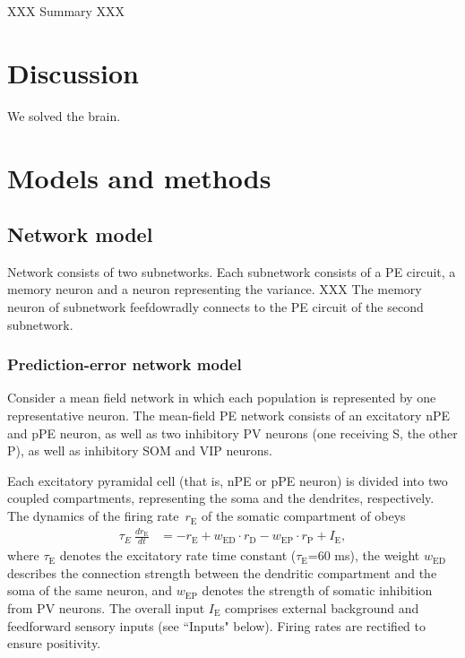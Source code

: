 \documentclass[10pt,a4paper,draft]{article}
\begin{document}
XXX Summary XXX


\section*{Discussion}

We solved the brain.


\section*{Models and methods}
%

\subsection*{Network model}
%
Network consists of two subnetworks. Each subnetwork consists of a PE circuit, a memory neuron and a neuron representing the variance. XXX The memory neuron of subnetwork feefdowradly connects to the PE circuit of the second subnetwork.

\subsubsection*{Prediction-error network model}
%
Consider a mean field network in which each population is represented by one representative neuron. The mean-field PE network consists of an excitatory nPE and pPE neuron, as well as two inhibitory PV neurons (one receiving S, the other P), as well as inhibitory SOM and VIP neurons.

Each excitatory pyramidal cell (that is, nPE or pPE neuron) is divided into two coupled compartments, representing the soma and the dendrites, respectively. The dynamics of the firing rate~$r_{\mathrm{E}}$ of the somatic compartment of obeys \citep{wilson1972excitatory}
%
\begin{align}
\tau_E\ \frac{dr_\mathrm{E}}{dt} &= - r_\mathrm{E} + w_\mathrm{ED}\cdot  r_\mathrm{D}  -  w_\mathrm{EP}\cdot r_\mathrm{P} + I_\mathrm{E},
\end{align}
%
where $\tau_\mathrm{E}$ denotes the excitatory rate time constant ($\tau_\mathrm{E}$=60 ms), the weight $w_{\mathrm{ED}}$ describes the connection strength between the dendritic compartment and the soma of the same neuron, and $w_{\mathrm{EP}}$ denotes the strength of somatic inhibition from PV neurons. The overall input $I_\mathrm{E}$ comprises external background and feedforward sensory  inputs (see ``Inputs" below). Firing rates are rectified to ensure positivity.
\end{document}
